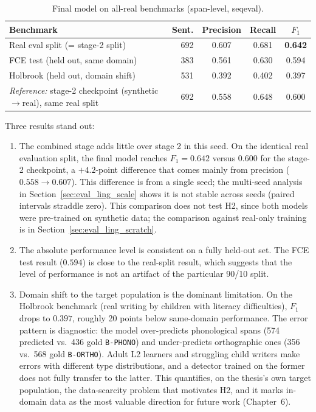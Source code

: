 \begin{table}[h]
\centering
\caption{Final model on all-real benchmarks (span-level, seqeval).}
\label{tab:ling_real}
\small
\begin{tabular}{@{}>{\raggedright\arraybackslash}p{}rccc@{}}
\toprule
\textbf{Benchmark} & \textbf{Sent.} & \textbf{Precision} & \textbf{Recall} & \textbf{$F_1$} \\
\midrule
Real eval split (= stage-2 split) & 692 & 0.607 & 0.681 & \textbf{0.642} \\
FCE test (held out, same domain) & 383 & 0.561 & 0.630 & 0.594 \\
Holbrook (held out, domain shift) & 531 & 0.392 & 0.402 & 0.397 \\
\midrule
\emph{Reference:} stage-2 checkpoint (synthetic$\to$real), same real split & 692 & 0.558 & 0.648 & 0.600 \\
\bottomrule
\end{tabular}
\end{table}

Three results stand out:

\begin{enumerate}
    \item The combined stage adds little over stage 2 in this seed. On the identical real evaluation split, the final model reaches $F_1 = 0.642$ versus $0.600$ for the stage-2 checkpoint, a $+4.2$-point difference that comes mainly from precision ($0.558 \rightarrow 0.607$). This difference is from a single seed; the multi-seed analysis in Section~\ref{sec:eval_ling_scale} shows it is not stable across seeds (paired intervals straddle zero). This comparison does not test H2, since both models were pre-trained on synthetic data; the comparison against real-only training is in Section~\ref{sec:eval_ling_scratch}.
    \item The absolute performance level is consistent on a fully held-out set. The FCE test result ($0.594$) is close to the real-split result, which suggests that the level of performance is not an artifact of the particular 90/10 split.
    \item Domain shift to the target population is the dominant limitation. On the Holbrook benchmark (real writing by children with literacy difficulties), $F_1$ drops to $0.397$, roughly 20 points below same-domain performance. The error pattern is diagnostic: the model over-predicts phonological spans (574 predicted vs.\ 436 gold \texttt{B-PHONO}) and under-predicts orthographic ones (356 vs.\ 568 gold \texttt{B-ORTHO}). Adult L2 learners and struggling child writers make errors with different type distributions, and a detector trained on the former does not fully transfer to the latter. This quantifies, on the thesis's own target population, the data-scarcity problem that motivates H2, and it marks in-domain data as the most valuable direction for future work (Chapter~6).
\end{enumerate}

